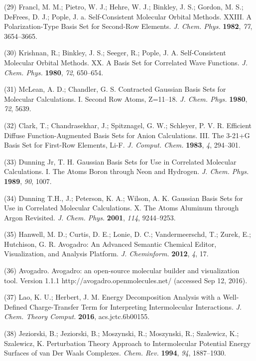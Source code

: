 (29) Francl, M. M.; Pietro, W. J.; Hehre, W. J.; Binkley, J. S.; Gordon, M. S.; DeFrees, D. J.; Pople, J. a. Self-Consistent Molecular Orbital Methods. XXIII. A Polarization-Type Basis Set for Second-Row Elements.  \emph{J. Chem. Phys.} \textbf{1982}, \emph{77}, 3654--3665.

(30) Krishnan, R.; Binkley, J. S.; Seeger, R.; Pople, J. A.  Self-Consistent Molecular Orbital Methods. XX. A Basis Set for Correlated Wave Functions. \emph{J. Chem. Phys.} \textbf{1980}, \emph{72}, 650--654.

(31) McLean, A. D.; Chandler, G. S. Contracted Gaussian Basis Sets for Molecular Calculations. I. Second Row Atoms, Z=11--18. \emph{J. Chem.  Phys.} \textbf{1980}, \emph{72}, 5639.

(32) Clark, T.; Chandrasekhar, J.; Spitznagel, G. W.; Schleyer, P. V. R.  Efficient Diffuse Function-Augmented Basis Sets for Anion Calculations.  III. The 3-21+G Basis Set for First-Row Elements, Li-F. \emph{J. Comput.  Chem.} \textbf{1983}, \emph{4}, 294--301.

(33) Dunning Jr, T. H. Gaussian Basis Sets for Use in Correlated Molecular Calculations. I. The Atoms Boron through Neon and Hydrogen.  \emph{J. Chem. Phys.} \textbf{1989}, \emph{90}, 1007.

(34) Dunning T.H., J.; Peterson, K. A.; Wilson, A. K. Gaussian Basis Sets for Use in Correlated Molecular Calculations. X. The Atoms Aluminum through Argon Revisited. \emph{J. Chem. Phys.} \textbf{2001}, \emph{114}, 9244--9253.

(35) Hanwell, M. D.; Curtis, D. E.; Lonie, D. C.; Vandermeerschd, T.; Zurek, E.; Hutchison, G. R. Avogadro: An Advanced Semantic Chemical Editor, Visualization, and Analysis Platform. \emph{J. Cheminform.}  \textbf{2012}, \emph{4}, 17.

(36) Avogadro. Avogadro: an open-source molecular builder and visualization tool. Version 1.1.1 http://avogadro.openmolecules.net/ (accessed Sep 12, 2016).

(37) Lao, K. U.; Herbert, J. M. Energy Decomposition Analysis with a Well-Defined Charge-Transfer Term for Interpreting Intermolecular Interactions. \emph{J. Chem. Theory Comput.} \textbf{2016}, acs.jctc.6b00155.

(38) Jeziorski, B.; Jeziorski, B.; Moszynski, R.; Moszynski, R.; Szalewicz, K.; Szalewicz, K. Perturbation Theory Approach to Intermolecular Potential Energy Surfaces of van Der Waals Complexes.  \emph{Chem. Rev.} \textbf{1994}, \emph{94}, 1887--1930.

